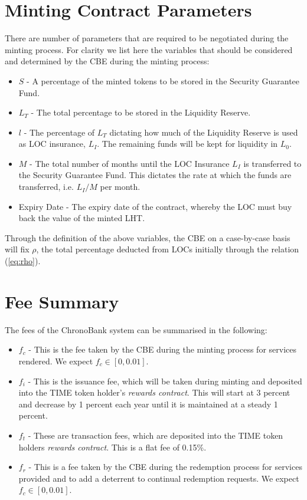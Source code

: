 \section{Minting Contract Parameters}
\label{sec:appendix:minting}

There are number of parameters that are required to be negotiated during the minting process. For clarity we list here the variables that should be considered and determined by the CBE during the minting process: 

\begin{itemize}
  \setlength\itemsep{2mm}
  \item $S$ - A percentage of the minted tokens to be stored in the Security Guarantee Fund.
  \item $L_T$ - The total percentage to be stored in the Liquidity Reserve. 
  \item $l$ - The percentage of $L_T$ dictating how much of the Liquidity Reserve is used as LOC insurance, $L_I$. The remaining funds will be kept for liquidity in $L_0$. 
  \item $M$ - The total number of months until the LOC Insurance $L_I$ is transferred to the Security Guarantee Fund. This dictates the rate at which the funds are transferred, i.e. $L_I/M$ per month. 
  \item Expiry Date - The expiry date of the contract, whereby the LOC must buy back the value of the minted LHT. 
\end{itemize}
Through the definition of the above variables, the CBE on a case-by-case basis will fix $\rho$, the total percentage deducted from LOCs initially through the relation (\ref{eq:rho}). \\


\section{Fee Summary}
\label{sec:appendix:fees}

The fees of the ChronoBank system can be summarised in the following:
\begin{itemize}
  \setlength\itemsep{2mm}
  \item $f_c$ - This is the fee taken by the CBE during the minting process for services rendered. We expect $f_c \in [0, 0.01]$. 
  \item $f_i$ - This is the issuance fee, which will be taken during minting and deposited into the TIME token holder's \textit{rewards contract}. This will start at 3 percent and decrease by 1 percent each year until it is maintained at a steady 1 percent. 
  \item $f_t$ - These are transaction fees, which are deposited into the TIME token holders \textit{rewards contract}. This is a flat fee of 0.15\%. 
   \item $f_r$ - This is a fee taken by the CBE during the redemption process for services provided and to add a deterrent to continual redemption requests. We expect $f_c \in [0,0.01]$. 
\end{itemize}




